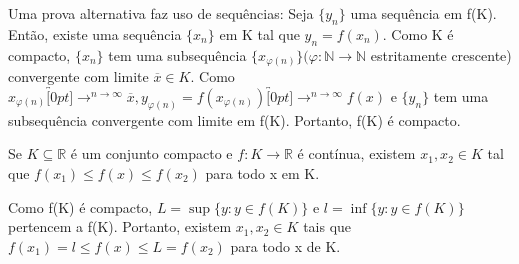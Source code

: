 \documentclass[analysis_notes.tex]{subfiles}
\begin{document}
\begin{proof*}
	Uma prova alternativa faz uso de sequências: Seja $\{y_{n}\}$ uma sequência em f(K). Então, existe uma sequência
	$\{x_{n}\}$ em K tal que $y_{n}=f(x_{n}).$ Como K é compacto, $\{x_{n}\}$ tem uma subsequência $\{x_{\varphi (n)}\}(\varphi :\mathbb{N}\rightarrow \mathbb{N}$
	estritamente crescente) convergente com limite $\overline{x}\in K.$ Como $x_{\varphi (n)}\overbracket[0pt]{\longrightarrow}^{n\to \infty}\overline{x},
		y_{\varphi (n)}=f(x_{\varphi (n)})\overbracket[0pt]{\longrightarrow}^{n\to \infty}f(x)$ e $\{y_{n}\}$ tem uma
	subsequência convergente com limite em f(K). Portanto, f(K) é compacto. \qedsymbol
\end{proof*}
\begin{theorem*}
	Se $K\subseteq{\mathbb{R}}$ é um conjunto compacto e $f:K\rightarrow \mathbb{R}$ é contínua, existem $x_{1},x_{2}\in K$ tal que
	$f(x_{1})\leq f(x)\leq f(x_{2})$ para todo x em K.
\end{theorem*}
\begin{proof*}
	Como f(K) é compacto, $L=\sup{\{y:y\in f(K)\}}$ e $l=\inf{\{y:y\in f(K)\}}$ pertencem a f(K). Portanto, existem $x_{1},x_{2}\in K$
	tais que $f(x_{1})=l\leq f(x)\leq L = f(x_{2})$ para todo x de K. \qedsymbol
\end{proof*}
\end{document}
